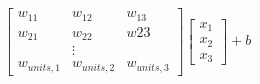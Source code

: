 \documentclass[preview]{standalone}
\begin{document}
\begin{align*}
\begin{bmatrix} w_{11} & w_{12} & w_{13} \\
                       w_{21} & w_{22} & w{23} \\ & \vdots & \\
                       w_{units, 1} & w_{units, 2} & w_{units, 3}
                       \end{bmatrix} \begin{bmatrix} x_1 \\ x_2 \\ x_3\end{bmatrix} + b
\end{align*}
\end{document}
